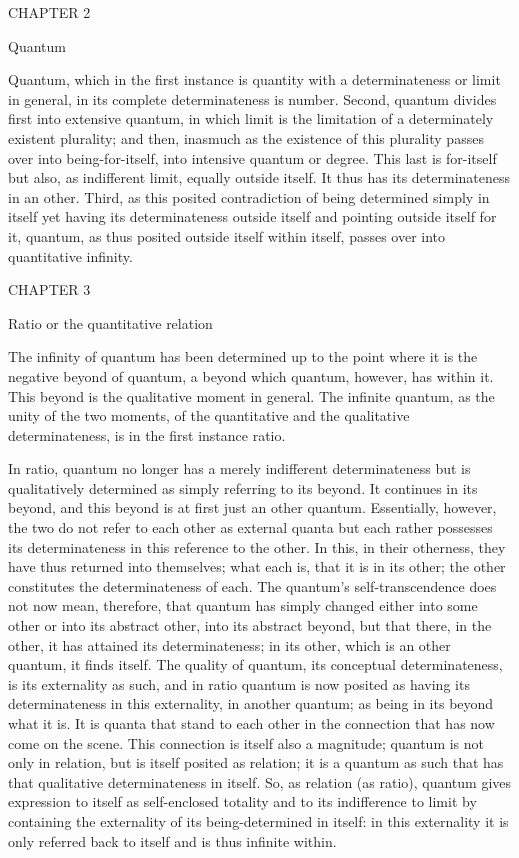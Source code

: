 CHAPTER 2

Quantum

Quantum, which in the first instance is quantity
with a determinateness or limit in general,
in its complete determinateness is number.
Second, quantum divides first into extensive quantum,
in which limit is the limitation of
a determinately existent plurality;
and then, inasmuch as the existence of
this plurality passes over into being-for-itself,
into intensive quantum or degree.
This last is for-itself but also,
as indifferent limit, equally outside itself.
It thus has its determinateness in an other.
Third, as this posited contradiction of
being determined simply in itself
yet having its determinateness outside itself
and pointing outside itself for it,
quantum, as thus posited outside itself within itself,
passes over into quantitative infinity.

CHAPTER 3

Ratio or the quantitative relation

The infinity of quantum has been determined up to
the point where it is the negative beyond of quantum,
a beyond which quantum, however, has within it.
This beyond is the qualitative moment in general.
The infinite quantum, as the unity of the two moments,
of the quantitative and the qualitative determinateness,
is in the first instance ratio.

In ratio, quantum no longer has
a merely indifferent determinateness
but is qualitatively determined as
simply referring to its beyond.
It continues in its beyond, and this beyond is
at first just an other quantum.
Essentially, however, the two do not refer
to each other as external quanta
but each rather possesses its determinateness
in this reference to the other.
In this, in their otherness, they have
thus returned into themselves;
what each is, that it is in its other;
the other constitutes the determinateness of each.
The quantum's self-transcendence does not now mean, therefore,
that quantum has simply changed either into some other
or into its abstract other, into its abstract beyond,
but that there, in the other, it has attained its determinateness;
in its other, which is an other quantum, it finds itself.
The quality of quantum, its conceptual determinateness,
is its externality as such,
and in ratio quantum is now posited as having
its determinateness in this externality, in another quantum;
as being in its beyond what it is.
It is quanta that stand to each other in the connection
that has now come on the scene.
This connection is itself also a magnitude;
quantum is not only in relation,
but is itself posited as relation;
it is a quantum as such that has
that qualitative determinateness in itself.
So, as relation (as ratio),
quantum gives expression to itself as self-enclosed totality
and to its indifference to limit by containing
the externality of its being-determined in itself:
in this externality it is only referred back to itself
and is thus infinite within.

